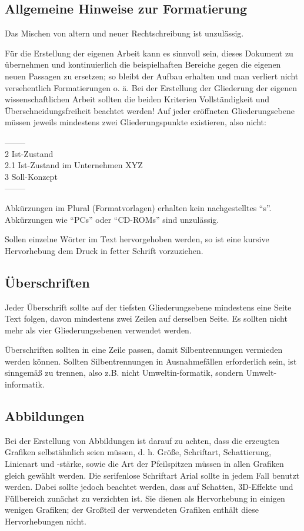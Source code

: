 \documentclass[11pt]{scrartcl}
\begin{document}
\subsection{Allgemeine Hinweise zur Formatierung}
Das Mischen von altern und neuer Rechtschreibung ist unzulässig. 

Für die Erstellung der eigenen Arbeit kann es sinnvoll sein, dieses Dokument zu übernehmen  und kontinuierlich die beispielhaften Bereiche gegen die eigenen neuen Passagen zu ersetzen; so bleibt der Aufbau erhalten und man verliert nicht versehentlich Formatierungen o. ä. Bei der Erstellung der Gliederung der eigenen wissenschaftlichen Arbeit sollten die beiden Kriterien Vollständigkeit und Überschneidungsfreiheit beachtet werden! Auf jeder eröffneten Gliederungsebene müssen jeweils mindestens zwei Gliederungspunkte existieren, also nicht:

\noindent--------\\
2	Ist-Zustand\\
2.1	Ist-Zustand im Unternehmen XYZ\\
3	Soll-Konzept\\
--------

Abkürzungen im Plural (Formatvorlagen) erhalten kein nachgestelltes "`s"'. Abkürzungen wie "`PCs"' oder "`CD-ROMs"' sind unzulässig.

Sollen einzelne Wörter im Text hervorgehoben werden, so ist eine kursive Hervorhebung dem Druck in fetter Schrift  vorzuziehen.

\subsection{Überschriften}
Jeder Überschrift sollte auf der tiefsten Gliederungsebene mindestens eine Seite Text folgen, davon mindestens zwei Zeilen auf derselben Seite. Es sollten nicht mehr als vier Gliederungsebenen verwendet werden. 

Überschriften sollten in eine Zeile passen, damit Silbentrennungen vermieden werden können. Sollten Silbentrennungen in Ausnahmefällen erforderlich sein, ist sinngemäß zu trennen, also z.B. nicht Umweltin-formatik, sondern Umwelt-informatik.

\subsection{Abbildungen}
Bei der Erstellung von Abbildungen ist darauf zu achten, dass die erzeugten Grafiken selbstähnlich seien müssen, d. h. Größe, Schriftart, Schattierung, Linienart und -stärke, sowie die Art der Pfeilspitzen müssen in allen Grafiken gleich gewählt werden. Die serifenlose Schriftart Arial sollte in jedem Fall benutzt werden. Dabei sollte jedoch beachtet werden, dass auf Schatten, 3D-Effekte  und Füllbereich zunächst zu verzichten ist. Sie dienen als Hervorhebung in einigen wenigen Grafiken; der Großteil der verwendeten Grafiken enthält diese Hervorhebungen nicht.
\end{document}
